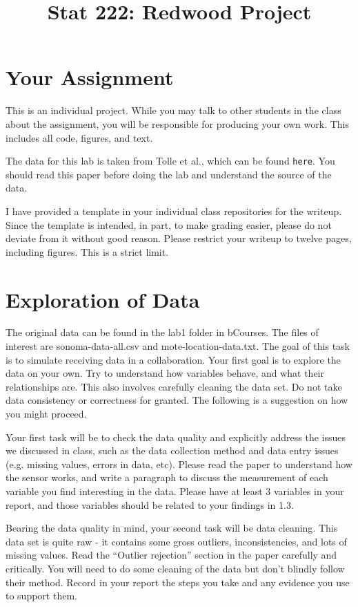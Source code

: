 \documentclass[11pt, oneside]{article}   	%
\title{Stat 222: Redwood Project}
\date{}							%
\begin{document}
\maketitle

\section{Your Assignment}

This is an individual project.  While you may talk to other students in the
class about the assignment, you will be responsible for producing your own
work.  This includes all code, figures, and text.

The data for this lab is taken from Tolle et al., which can be found
\texttt{here}. You should read this paper before doing the lab and understand
the source of the data.

I have provided a template in your individual class repositories for the
writeup. Since the template is intended, in part, to make grading easier,
please do not deviate from it without good reason.  Please restrict your
writeup to twelve pages, including figures. This is a strict limit.

\section{Exploration of Data}

The original data can be found in the lab1 folder in bCourses. The files of
interest are sonoma-data-all.csv and mote-location-data.txt. The goal of this
task is to simulate receiving data in a collaboration. Your first goal is to
explore the data on your own. Try to understand how variables behave, and what
their relationships are. This also involves carefully cleaning the data set. Do
not take data consistency or correctness for granted. The following is a
suggestion on how you might proceed.

Your first task will be to check the data quality and explicitly address the
issues we discussed in class, such as the data collection method and data entry
issues (e.g. missing values, errors in data, etc). Please read the paper to
understand how the sensor works, and write a paragraph to discuss the
measurement of each variable you find interesting in the data. Please have at
least 3 variables in your report, and those variables should be related to your
findings in 1.3.

Bearing the data quality in mind, your second task will be data cleaning. This
data set is quite raw - it contains some gross outliers, inconsistencies, and
lots of missing values. Read the ``Outlier rejection'' section in the paper
carefully and critically.  You will need to do some cleaning of the data but
don’t blindly follow their method. Record in your report the steps you take and
any evidence you use to support them.
\end{document}
